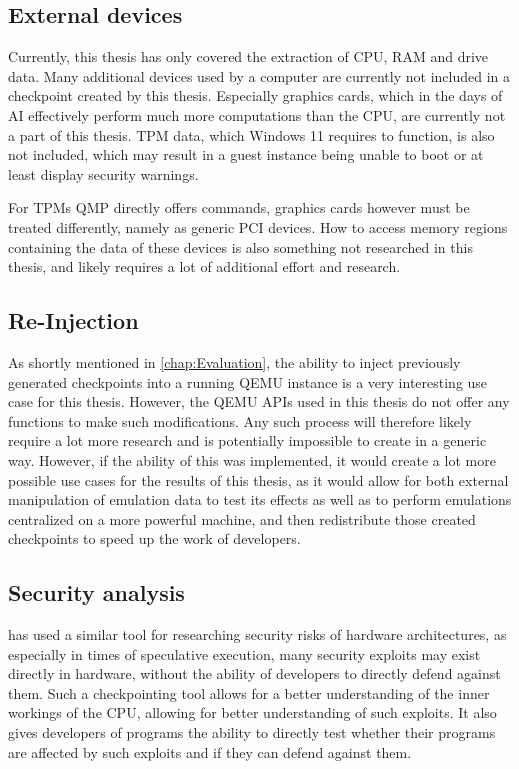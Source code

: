 \subsection{External devices}
Currently, this thesis has only covered the extraction of CPU, RAM and drive data.
Many additional devices used by a computer are currently not included in a checkpoint created by this thesis.
Especially graphics cards, which in the days of AI effectively perform much more computations than the CPU,
are currently not a part of this thesis.
TPM data, which Windows 11 requires to function, is also not included,
which may result in a guest instance being unable to boot or at least display security warnings.

For TPMs QMP directly offers commands, graphics cards however must be treated differently, namely as generic PCI devices.
How to access memory regions containing the data of these devices is also something not researched in this thesis,
and likely requires a lot of additional effort and research.

\subsection{Re-Injection}\label{sec:injection}
As shortly mentioned in \autoref{chap:Evaluation},
the ability to inject previously generated checkpoints into a running QEMU instance is a very interesting use case for this thesis.
However, the QEMU APIs used in this thesis do not offer any functions to make such modifications.
Any such process will therefore likely require a lot more research and is potentially impossible to create in a generic way.
However, if the ability of this was implemented,
it would create a lot more possible use cases for the results of this thesis,
as it would allow for both external manipulation of emulation data to test its effects
as well as to perform emulations centralized on a more powerful machine,
and then redistribute those created checkpoints to speed up the work of developers.

\subsection{Security analysis}
 has used a similar tool for researching security risks of hardware architectures,
as especially in times of speculative execution,
many security exploits may exist directly in hardware,
without the ability of developers to directly defend against them\cite{lapidary}.
Such a checkpointing tool allows for a better understanding of the inner workings of the CPU,
allowing for better understanding of such exploits.
It also gives developers of programs the ability to directly test whether their programs
are affected by such exploits and if they can defend against them.

